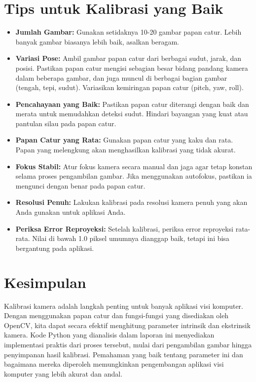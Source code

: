 \documentclass[12pt,a4paper]{article}
\begin{document}
\section{Tips untuk Kalibrasi yang Baik}
\begin{itemize}
    \item \textbf{Jumlah Gambar:} Gunakan setidaknya 10-20 gambar papan catur. Lebih banyak gambar biasanya lebih baik, asalkan beragam.
    \item \textbf{Variasi Pose:} Ambil gambar papan catur dari berbagai sudut, jarak, dan posisi. Pastikan papan catur mengisi sebagian besar bidang pandang kamera dalam beberapa gambar, dan juga muncul di berbagai bagian gambar (tengah, tepi, sudut). Variasikan kemiringan papan catur (pitch, yaw, roll).
    \item \textbf{Pencahayaan yang Baik:} Pastikan papan catur diterangi dengan baik dan merata untuk memudahkan deteksi sudut. Hindari bayangan yang kuat atau pantulan silau pada papan catur.
    \item \textbf{Papan Catur yang Rata:} Gunakan papan catur yang kaku dan rata. Papan yang melengkung akan menghasilkan kalibrasi yang tidak akurat.
    \item \textbf{Fokus Stabil:} Atur fokus kamera secara manual dan jaga agar tetap konstan selama proses pengambilan gambar. Jika menggunakan autofokus, pastikan ia mengunci dengan benar pada papan catur.
    \item \textbf{Resolusi Penuh:} Lakukan kalibrasi pada resolusi kamera penuh yang akan Anda gunakan untuk aplikasi Anda.
    \item \textbf{Periksa Error Reproyeksi:} Setelah kalibrasi, periksa error reproyeksi rata-rata. Nilai di bawah 1.0 piksel umumnya dianggap baik, tetapi ini bisa bergantung pada aplikasi.
\end{itemize}

\section{Kesimpulan}
Kalibrasi kamera adalah langkah penting untuk banyak aplikasi visi komputer.
Dengan menggunakan papan catur dan fungsi-fungsi yang disediakan oleh OpenCV,
kita dapat secara efektif menghitung parameter intrinsik dan ekstrinsik kamera.
Kode Python yang dianalisis dalam laporan ini menyediakan implementasi praktis
dari proses tersebut, mulai dari pengambilan gambar hingga penyimpanan hasil
kalibrasi. Pemahaman yang baik tentang parameter ini dan bagaimana mereka
diperoleh memungkinkan pengembangan aplikasi visi komputer yang lebih akurat
dan andal.
\end{document}
